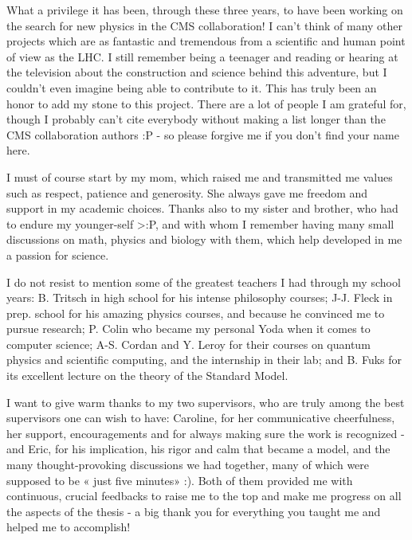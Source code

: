 \emptypage


What a privilege it has been, through these three years, to have been working on the search
for new physics in the CMS collaboration! I can't think of many other projects which are
as fantastic and tremendous from a scientific and human point of view as the LHC. I still
remember being a teenager and reading or hearing at the television about the construction
and science behind this adventure, but I couldn't even imagine being able to contribute to
it. This has truly been an honor to add my stone to this project. There are a lot of people
I am grateful for, though I probably can't cite everybody without making a list longer than
the CMS collaboration authors :P - so please forgive me if you don't find your name here.

I must of course start by my mom, which raised me and transmitted me values such as respect,
patience and generosity. She always gave me freedom and support in my academic choices.
Thanks also to my sister and brother, who had to endure my younger-self >:P, and with whom
I remember having many small discussions on math, physics and biology with them, which help
developed in me a passion for science.

I do not resist to mention some of the greatest teachers I had through my school years:
B. Tritsch in high school for his intense philosophy courses; J-J. Fleck in prep. school
for his amazing physics courses, and because he convinced me to pursue research; P. Colin
who became my personal Yoda when it comes to computer science; A-S. Cordan and Y. Leroy
for their courses on quantum physics and scientific computing, and the internship in their
lab; and B. Fuks for its excellent lecture on the theory of the Standard Model.

I want to give warm thanks to my two supervisors, who are truly among the best supervisors
one can wish to have: Caroline, for her communicative cheerfulness, her support, encouragements
and for always making sure the work is recognized - and Eric, for his implication, his rigor
and calm that became a model, and the many thought-provoking discussions we had together,
many of which were supposed to be « just five minutes» :). Both of them provided me with
continuous, crucial feedbacks to raise me to the top and make me progress on all the aspects
of the thesis - a big thank you for everything you taught me and helped me to accomplish!

